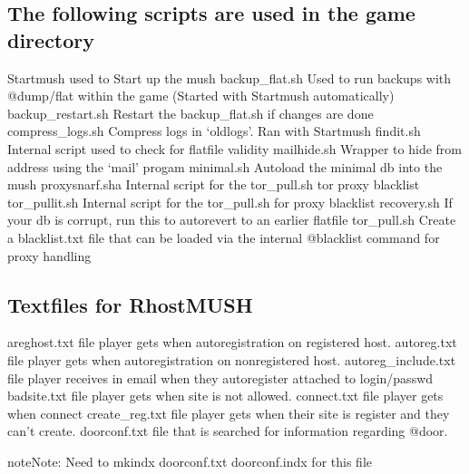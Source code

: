 \documentclass[letterpaper,10pt,english]{sphinxmanual}
\begin{document}
\subsection{The following scripts are used in the game directory}
\label{\detokenize{maintenance:the-following-scripts-are-used-in-the-game-directory}}
\sphinxAtStartPar
Startmush               \textendash{} used to Start up the mush
backup\_flat.sh          \textendash{} Used to run backups with @dump/flat within the game (Started with Startmush automatically)
backup\_restart.sh       \textendash{} Restart the backup\_flat.sh if changes are done
compress\_logs.sh        \textendash{} Compress logs in ‘oldlogs’.  Ran with Startmush
findit.sh               \textendash{} Internal script used to check for flatfile validity
mailhide.sh             \textendash{} Wrapper to hide from address using the ‘mail’ progam
minimal.sh              \textendash{} Auto\sphinxhyphen{}load the minimal db into the mush
proxysnarf.sha          \textendash{} Internal script for the tor\_pull.sh tor proxy blacklist
tor\_pullit.sh           \textendash{} Internal script for the tor\_pull.sh for proxy blacklist
recovery.sh             \textendash{} If your db is corrupt, run this to auto\sphinxhyphen{}revert to an earlier flatfile
tor\_pull.sh             \textendash{} Create a blacklist.txt file that can be loaded via the internal @blacklist command for proxy handling


\subsection{Textfiles for RhostMUSH}
\label{\detokenize{maintenance:textfiles-for-rhostmush}}
\sphinxAtStartPar
areghost.txt           \sphinxhyphen{} file player gets when autoregistration on registered host.
autoreg.txt            \sphinxhyphen{} file player gets when autoregistration on non\sphinxhyphen{}registered host.
autoreg\_include.txt    \sphinxhyphen{} file player receives in email when they autoregister attached to login/passwd
badsite.txt            \sphinxhyphen{} file player gets when site is not allowed.
connect.txt            \sphinxhyphen{} file player gets when connect
create\_reg.txt         \sphinxhyphen{} file player gets when their site is register and they can’t create.
doorconf.txt           \sphinxhyphen{} file that is searched for information regarding @door.

\begin{sphinxadmonition}{note}{Note:}
\sphinxAtStartPar
Need to mkindx doorconf.txt doorconf.indx for this file
\end{sphinxadmonition}
\end{document}
